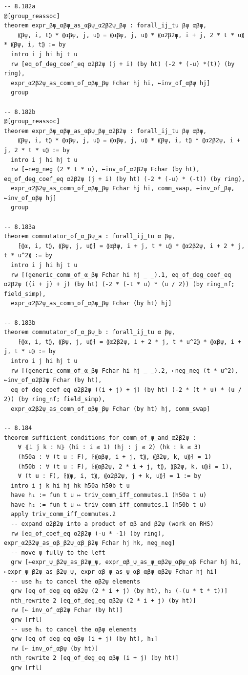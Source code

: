 \begin{Verbatim}
-- 8.182a
@[group_reassoc]
theorem expr_βψ_αβψ_as_αβψ_α2β2ψ_βψ : forall_ij_tu βψ αβψ,
    ⸨βψ, i, t⸩ * ⸨αβψ, j, u⸩ = ⸨αβψ, j, u⸩ * ⸨α2β2ψ, i + j, 2 * t * u⸩ * ⸨βψ, i, t⸩ := by
  intro i j hi hj t u
  rw [eq_of_deg_coef_eq α2β2ψ (j + i) (by ht) (-2 * (-u) *(t)) (by ring),
  expr_α2β2ψ_as_comm_of_αβψ_βψ Fchar hj hi, ←inv_of_αβψ hj]
  group

-- 8.182b
@[group_reassoc]
theorem expr_βψ_αβψ_as_αβψ_βψ_α2β2ψ : forall_ij_tu βψ αβψ,
    ⸨βψ, i, t⸩ * ⸨αβψ, j, u⸩ = ⸨αβψ, j, u⸩ * ⸨βψ, i, t⸩ * ⸨α2β2ψ, i + j, 2 * t * u⸩ := by
  intro i j hi hj t u
  rw [←neg_neg (2 * t * u), ←inv_of_α2β2ψ Fchar (by ht), eq_of_deg_coef_eq α2β2ψ (j + i) (by ht) (-2 * (-u) * (-t)) (by ring),
  expr_α2β2ψ_as_comm_of_αβψ_βψ Fchar hj hi, comm_swap, ←inv_of_βψ, ←inv_of_αβψ hj]
  group

-- 8.183a
theorem commutator_of_α_βψ_a : forall_ij_tu α βψ,
    ⁅⸨α, i, t⸩, ⸨βψ, j, u⸩⁆ = ⸨αβψ, i + j, t * u⸩ * ⸨α2β2ψ, i + 2 * j, t * u^2⸩ := by
  intro i j hi hj t u
  rw [(generic_comm_of_α_βψ Fchar hi hj _ _).1, eq_of_deg_coef_eq α2β2ψ ((i + j) + j) (by ht) (-2 * (-t * u) * (u / 2)) (by ring_nf; field_simp),
  expr_α2β2ψ_as_comm_of_αβψ_βψ Fchar (by ht) hj]

-- 8.183b
theorem commutator_of_α_βψ_b : forall_ij_tu α βψ,
    ⁅⸨α, i, t⸩, ⸨βψ, j, u⸩⁆ = ⸨α2β2ψ, i + 2 * j, t * u^2⸩ * ⸨αβψ, i + j, t * u⸩ := by
  intro i j hi hj t u
  rw [(generic_comm_of_α_βψ Fchar hi hj _ _).2, ←neg_neg (t * u^2), ←inv_of_α2β2ψ Fchar (by ht),
  eq_of_deg_coef_eq α2β2ψ ((i + j) + j) (by ht) (-2 * (t * u) * (u / 2)) (by ring_nf; field_simp),
  expr_α2β2ψ_as_comm_of_αβψ_βψ Fchar (by ht) hj, comm_swap]

-- 8.184
theorem sufficient_conditions_for_comm_of_ψ_and_α2β2ψ :
    ∀ ⦃i j k : ℕ⦄ (hi : i ≤ 1) (hj : j ≤ 2) (hk : k ≤ 3)
    (h50a : ∀ (t u : F), ⁅⸨αβψ, i + j, t⸩, ⸨β2ψ, k, u⸩⁆ = 1)
    (h50b : ∀ (t u : F), ⁅⸨αβ2ψ, 2 * i + j, t⸩, ⸨β2ψ, k, u⸩⁆ = 1),
    ∀ (t u : F), ⁅⸨ψ, i, t⸩, ⸨α2β2ψ, j + k, u⸩⁆ = 1 := by
  intro i j k hi hj hk h50a h50b t u
  have h₁ := fun t u ↦ triv_comm_iff_commutes.1 (h50a t u)
  have h₂ := fun t u ↦ triv_comm_iff_commutes.1 (h50b t u)
  apply triv_comm_iff_commutes.2
  -- expand α2β2ψ into a product of αβ and β2ψ (work on RHS)
  rw [eq_of_coef_eq α2β2ψ (-u * -1) (by ring), expr_α2β2ψ_as_αβ_β2ψ_αβ_β2ψ Fchar hj hk, neg_neg]
  -- move ψ fully to the left
  grw [←expr_ψ_β2ψ_as_β2ψ_ψ, expr_αβ_ψ_as_ψ_αβ2ψ_αβψ_αβ Fchar hj hi, ←expr_ψ_β2ψ_as_β2ψ_ψ, expr_αβ_ψ_as_ψ_αβ_αβψ_αβ2ψ Fchar hj hi]
  -- use h₂ to cancel the αβ2ψ elements
  grw [eq_of_deg_eq αβ2ψ (2 * i + j) (by ht), h₂ (-(u * t * t))]
  nth_rewrite 2 [eq_of_deg_eq αβ2ψ (2 * i + j) (by ht)]
  rw [← inv_of_αβ2ψ Fchar (by ht)]
  grw [rfl]
  -- use h₁ to cancel the αβψ elements
  grw [eq_of_deg_eq αβψ (i + j) (by ht), h₁]
  rw [← inv_of_αβψ (by ht)]
  nth_rewrite 2 [eq_of_deg_eq αβψ (i + j) (by ht)]
  grw [rfl]
\end{Verbatim}
